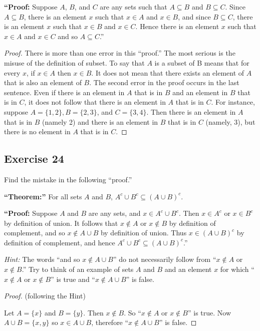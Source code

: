 \documentclass[14pt]{extarticle}
\begin{document}
  {\bf “Proof:} Suppose $A$, $B$, and $C$ are any sets such that \(A \subseteq B\) and \(B \subseteq C\). Since
\(A \subseteq B\), there is an element $x$ such that \(x \in A\) and \(x \in B\), and since \(B \subseteq C\), there
is an element $x$ such that \(x \in B\) and \(x \in C\). Hence there is an element $x$ such that \(x \in A\) and
\(x \in C\) and so \(A \subseteq C\).”

\begin{proof}
  There is more than one error in this “proof.” The most serious is the misuse of the definition of subset. To say
  that $A$ is a subset of B means that for every $x$, if $x \in A$ then $x \in B$. It does not mean that there exists
  an element of $A$ that is also an element of $B$. The second error in the proof occurs in the last sentence. Even
  if there is an element in $A$ that is in $B$ and an element in $B$ that is in $C$, it does not follow that there is an
  element in $A$ that is in $C$. For instance, suppose \(A = \{1, 2\}, B = \{2, 3\}\), and \(C = \{3, 4\}\). Then there
  is an element in $A$ that is in $B$ (namely 2) and there is an element in $B$ that is in $C$ (namely, 3), but there is
  no element in $A$ that is in $C$.
\end{proof}

\subsection{Exercise 24}
Find the mistake in the following “proof.”

{\bf “Theorem:”} For all sets $A$ and $B$, \(A^c \cup B^c \subseteq (A \cup B)^c\).

  {\bf “Proof:} Suppose $A$ and $B$ are any sets, and \(x \in A^c \cup B^c\). Then \(x \in A^c\) or \(x \in B^c\) by
definition of union. It follows that \(x \notin A\) or \(x \notin B\) by definition of complement, and so
\(x \notin A \cup B\) by definition of union. Thus \(x \in (A \cup B)^c\) by definition of complement, and hence
\(A^c \cup B^c \subseteq (A \cup B)^c\).”

{\it Hint:} The words “and so \(x \notin A \cup B\)” do not necessarily follow from “\(x \notin A\) or \(x \notin B\).”
Try to think of an example of sets $A$ and $B$ and an element $x$ for which “\(x \notin A\) or \(x \notin B\)” is
true and “\(x \notin A \cup B\)” is false.

\begin{proof}
  (following the Hint)

  Let \(A = \{x\}\) and \(B = \{y\}\). Then \(x \notin B\). So “\(x \notin A\) or \(x \notin B\)” is true. Now
  \(A \cup B = \{x, y\}\) so \(x \in A \cup B\), therefore “\(x \notin A \cup B\)” is false.
\end{proof}
\end{document}
